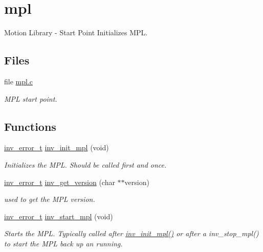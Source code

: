 \hypertarget{group___m_p_l}{}\section{mpl}
\label{group___m_p_l}


Motion Library -\/ Start Point Initializes M\+P\+L.  


\subsection*{Files}
\begin{DoxyCompactItemize}
\item 
file \hyperlink{mpl_8c}{mpl.\+c}
\begin{DoxyCompactList}\small\item\em M\+P\+L start point. \end{DoxyCompactList}\end{DoxyCompactItemize}
\subsection*{Functions}
\begin{DoxyCompactItemize}
\item 
\hyperlink{structinv__error__t}{inv\+\_\+error\+\_\+t} \hyperlink{group___m_p_l_gaa1a1f898ca9f60e0edd26ad644a131ab}{inv\+\_\+init\+\_\+mpl} (void)
\begin{DoxyCompactList}\small\item\em Initializes the M\+P\+L. Should be called first and once. \end{DoxyCompactList}\item 
\hyperlink{structinv__error__t}{inv\+\_\+error\+\_\+t} \hyperlink{group___m_p_l_gaf179a96755fbe87bab43ac7dae97caa2}{inv\+\_\+get\+\_\+version} (char $\ast$$\ast$version)
\begin{DoxyCompactList}\small\item\em used to get the M\+P\+L version. \end{DoxyCompactList}\item 
\hyperlink{structinv__error__t}{inv\+\_\+error\+\_\+t} \hyperlink{group___m_p_l_ga0f2aa09b1e0db8f568bbfd94028fb246}{inv\+\_\+start\+\_\+mpl} (void)
\begin{DoxyCompactList}\small\item\em Starts the M\+P\+L. Typically called after \hyperlink{group___m_p_l_gaa1a1f898ca9f60e0edd26ad644a131ab}{inv\+\_\+init\+\_\+mpl()} or after a inv\+\_\+stop\+\_\+mpl() to start the M\+P\+L back up an running. \end{DoxyCompactList}\end{DoxyCompactItemize}
